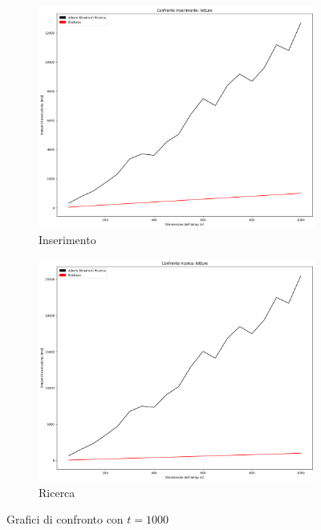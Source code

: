 \begin{figure}[H]
    \centering
    \begin{subfigure}[b]{0.49\textwidth}
        \centering
        \includegraphics[width=\textwidth]{comparison-graphs/insert-wr-t1000.png}
        \caption{Inserimento}
        \label{fig:compgraphinserttimet1000}
    \end{subfigure}
    \hfill
    \begin{subfigure}[b]{0.49\textwidth}
        \centering
        \includegraphics[width=\textwidth]{comparison-graphs/search-wr-t1000.png}
        \caption{Ricerca}
        \label{fig:compgraphsearchtimet1000}
    \end{subfigure}
    \caption{Grafici di confronto con $t=1000$}
    \label{fig:compgraphtimest1000}
\end{figure}

